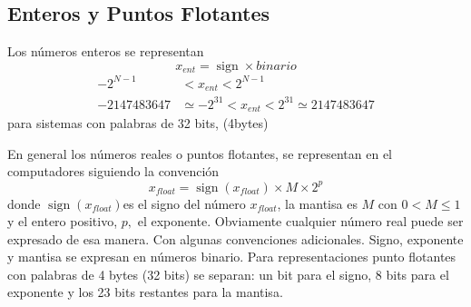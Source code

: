 \documentclass[spanish,titlepage,11pt]{article}
\begin{document}
\subsection{Enteros y Puntos Flotantes}

Los n\'{u}meros enteros se representan
\begin{equation}
x_{ent}=\operatorname*{sign}\times binario
\end{equation}%
\begin{align}
-2^{N-1}  &  <x_{ent}<2^{N-1}\\
-2147483647  &  \simeq-2^{31}<x_{ent}<2^{31}\simeq2147483647
\end{align}
para sistemas con palabras de 32 bits, (4bytes)

En general los n\'{u}meros reales o puntos flotantes, se representan en el
computadores siguiendo la convenci\'{o}n
\begin{equation}
x_{float}=\operatorname*{sign}\left(  x_{float}\right)  \times M\times2^{p}%
\end{equation}
donde $\operatorname*{sign}\left(  x_{float}\right)  $es el signo del
n\'{u}mero $x_{float}$, la mantisa es $M$ con $0<M\leq1$ y el entero positivo,
$p,$ el exponente. Obviamente cualquier n\'{u}mero real puede ser expresado de
esa manera. Con algunas convenciones adicionales. Signo, exponente y mantisa
se expresan en n\'{u}meros binario. Para representaciones punto flotantes con
palabras de 4 bytes (32 bits) se separan: un bit para el signo, 8 bits para el
exponente y los 23 bits restantes para la mantisa.
\end{document}
